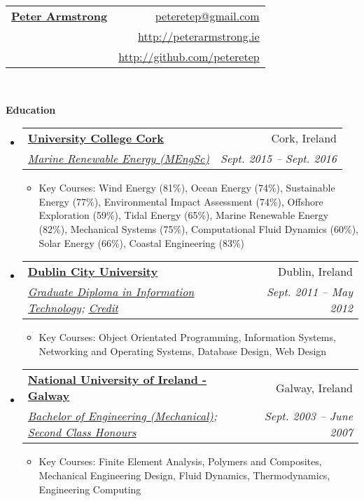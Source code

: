 \documentclass[letterpaper,11pt]{article}
\makeatletter
\newcommand{\resitem}[1]{\item #1 \vspace{-2pt}}
\newcommand{\resheading}[1]{{\large \colorbox{mygrey}{\begin{minipage}{\textwidth}{\textbf{#1 \vphantom{p\^{E}}}}\end{minipage}}}}
\newcommand{\ressubheading}[4]{
\begin{tabular*}{6.5in}{l@{\extracolsep{\fill}}r}
		\textbf{#1} & #2 \\
		\textit{#3} & \textit{#4} \\
\end{tabular*}\vspace{-6pt}}
\makeatother
\begin{document}
\newcommand{\mywebheader}{
\begin{tabular*}{7in}{l@{\extracolsep{\fill}}r}
	\textbf{\href{http://peterarmstrong.ie/}{\LARGE Peter Armstrong}} & \href{mailto:peteretep@gmail.com}{peteretep@gmail.com}\\
	& \href{http://peterarmstrong.ie}{http://peterarmstrong.ie} \\
	& \href{http://github.com/peteretep}{http://github.com/peteretep}
	\end{tabular*}
\\
\vspace{0.1in}}

\mywebheader

\resheading{Education}
	\begin{itemize}
    \item
      \ressubheading{\href{http://www.ucc.ie}{University College Cork}}{Cork, Ireland}{\href{http://www.ucc.ie/en/ckr51/}{Marine Renewable Energy (MEngSc)}}
      {Sept. 2015 -- Sept. 2016}
        { \footnotesize
        \begin{itemize}
        \resitem{Key Courses: Wind Energy (81\%), Ocean Energy (74\%), Sustainable Energy (77\%), Environmental Impact Assessment (74\%), Offshore Exploration (59\%), Tidal Energy (65\%), Marine Renewable Energy (82\%), Mechanical Systems (75\%), Computational Fluid Dynamics (60\%), Solar Energy (66\%), Coastal Engineering (83\%)}
        \end{itemize}
        }

    \item
      \ressubheading{\href{http://www.dcu.ie}{Dublin City University}}{Dublin, Ireland}{\href{https://www.dcu.ie/prospective/deginfo.php?classname=GDF\&originating_school=40}{Graduate Diploma in Information Technology};
      \href{http://peterarmstrong.ie/cv/grad_dip_it_transcript.pdf}{Credit}}
      {Sept. 2011 -- May 2012}
        { \footnotesize
        \begin{itemize}
        \resitem{Key Courses: Object Orientated Programming, Information Systems, Networking and Operating Systems, Database Design, Web Design}
        \end{itemize}
        }

		\item
			\ressubheading{\href{http://www.nuigalway.ie}{National University of Ireland - Galway}}{Galway, Ireland}
			{\href{http://www.nuigalway.ie/courses/undergraduate-courses/mechanical-engineering.html}{Bachelor of Engineering (Mechanical)}; 
			\href{http://peterarmstrong.ie/cv/mech_eng_transcript.jpg}{Second Class Honours}}
      {Sept. 2003 -- June 2007}
				{ \footnotesize
				\begin{itemize}
					\resitem{Key Courses: Finite Element Analysis, Polymers and Composites, Mechanical Engineering Design, Fluid Dynamics, Thermodynamics, Engineering Computing }
				\end{itemize}
				}

	\end{itemize} %
\end{document}
